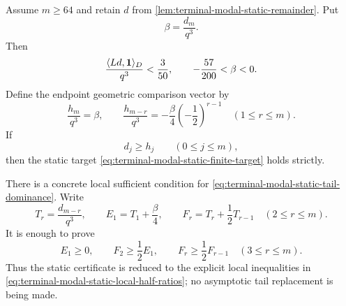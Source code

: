 \begin{lemma}
\label{lem:terminal-modal-static-tail-reduction}
Assume $m\ge64$ and retain $d$ from
\cref{lem:terminal-modal-static-remainder}.  Put
\[
 \beta=\frac{d_m}{q^3}.
\]
Then
\begin{equation}
 \frac{\langle Ld,\mathbf{1}\rangle_D}{q^3}<\frac3{50},
 \qquad -\frac{57}{200}<\beta<0.
 \label{eq:terminal-modal-static-mass-endpoint}
\end{equation}
Define the endpoint geometric comparison vector by
\begin{equation}
 \frac{h_m}{q^3}=\beta,
 \qquad
 \frac{h_{m-r}}{q^3}
 =-\frac{\beta}{4}\left(-\frac12\right)^{r-1}
 \quad(1\le r\le m).
 \label{eq:terminal-modal-static-tail-comparator}
\end{equation}
If
\begin{equation}
 d_j\ge h_j\qquad(0\le j\le m),
 \label{eq:terminal-modal-static-tail-dominance}
\end{equation}
then the static target
\eqref{eq:terminal-modal-static-finite-target} holds strictly.

There is a concrete local sufficient condition for
\eqref{eq:terminal-modal-static-tail-dominance}.  Write
\[
 T_r=\frac{d_{m-r}}{q^3},\qquad
 E_1=T_1+\frac\beta4,
 \qquad F_r=T_r+\frac12T_{r-1}\quad(2\le r\le m).
\]
It is enough to prove
\begin{equation}
 E_1\ge0,\qquad F_2\ge\frac12E_1,\qquad
 F_r\ge\frac12F_{r-1}\quad(3\le r\le m).
 \label{eq:terminal-modal-static-local-half-ratios}
\end{equation}
Thus the static certificate is reduced to the explicit local inequalities
in \eqref{eq:terminal-modal-static-local-half-ratios}; no asymptotic tail
replacement is being made.
\end{lemma}

